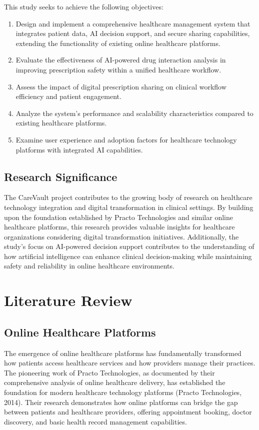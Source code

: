 \documentclass[12pt,a4paper]{article}
\begin{document}
This study seeks to achieve the following objectives:

\begin{enumerate}
    \item Design and implement a comprehensive healthcare management system that integrates patient data, AI decision support, and secure sharing capabilities, extending the functionality of existing online healthcare platforms.
    \item Evaluate the effectiveness of AI-powered drug interaction analysis in improving prescription safety within a unified healthcare workflow.
    \item Assess the impact of digital prescription sharing on clinical workflow efficiency and patient engagement.
    \item Analyze the system's performance and scalability characteristics compared to existing healthcare platforms.
    \item Examine user experience and adoption factors for healthcare technology platforms with integrated AI capabilities.
\end{enumerate}

\subsection{Research Significance}

The CareVault project contributes to the growing body of research on healthcare technology integration and digital transformation in clinical settings. By building upon the foundation established by Practo Technologies and similar online healthcare platforms, this research provides valuable insights for healthcare organizations considering digital transformation initiatives. Additionally, the study's focus on AI-powered decision support contributes to the understanding of how artificial intelligence can enhance clinical decision-making while maintaining safety and reliability in online healthcare environments.

\section{Literature Review}

\subsection{Online Healthcare Platforms}

The emergence of online healthcare platforms has fundamentally transformed how patients access healthcare services and how providers manage their practices. The pioneering work of Practo Technologies, as documented by their comprehensive analysis of online healthcare delivery, has established the foundation for modern healthcare technology platforms (Practo Technologies, 2014). Their research demonstrates how online platforms can bridge the gap between patients and healthcare providers, offering appointment booking, doctor discovery, and basic health record management capabilities.
\end{document}
